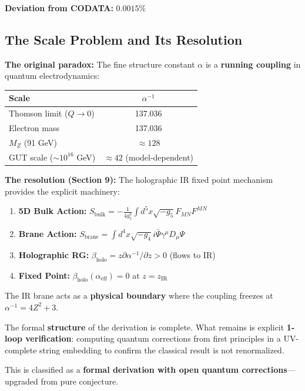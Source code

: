 \documentclass[12pt,a4paper]{article}
\newcommand{\Zsq}{Z^2}
\begin{document}
\textbf{Deviation from CODATA:} $0.0015\%$

\subsection{The Scale Problem and Its Resolution}

\begin{tcolorbox}[colback=green!5!white, colframe=green!60!black, title=Theoretical Resolution (v8.4.0)]
\textbf{The original paradox:} The fine structure constant $\alpha$ is a \textbf{running coupling} in quantum electrodynamics:

\begin{center}
\begin{tabular}{lc}
\toprule
\textbf{Scale} & $\alpha^{-1}$ \\
\midrule
Thomson limit ($Q \to 0$) & 137.036 \\
Electron mass & 137.036 \\
$M_Z$ (91 GeV) & $\approx 128$ \\
GUT scale ($\sim 10^{16}$ GeV) & $\approx 42$ (model-dependent) \\
\bottomrule
\end{tabular}
\end{center}

\textbf{The resolution (Section 9):} The holographic IR fixed point mechanism provides the explicit machinery:
\begin{enumerate}
    \item \textbf{5D Bulk Action:} $S_{\text{bulk}} = -\frac{1}{4g_5^2}\int d^5x\sqrt{-g_5}F_{MN}F^{MN}$
    \item \textbf{Brane Action:} $S_{\text{brane}} = \int d^4x\sqrt{-g_4}i\bar{\Psi}\gamma^\mu D_\mu\Psi$
    \item \textbf{Holographic RG:} $\beta_{\text{holo}} = z\partial\alpha^{-1}/\partial z > 0$ (flows to IR)
    \item \textbf{Fixed Point:} $\beta_{\text{holo}}(\alpha_{\text{eff}}) = 0$ at $z = z_{\text{IR}}$
\end{enumerate}

The IR brane acts as a \textbf{physical boundary} where the coupling freezes at $\alpha^{-1} = 4\Zsq + 3$.
\end{tcolorbox}

\begin{tcolorbox}[colback=yellow!10!white, colframe=orange!75!black, title=Remaining Quantum Gap]
The formal \textbf{structure} of the derivation is complete. What remains is explicit \textbf{1-loop verification}: computing quantum corrections from first principles in a UV-complete string embedding to confirm the classical result is not renormalized.

This is classified as a \textbf{formal derivation with open quantum corrections}---upgraded from pure conjecture.
\end{tcolorbox}
\end{document}
